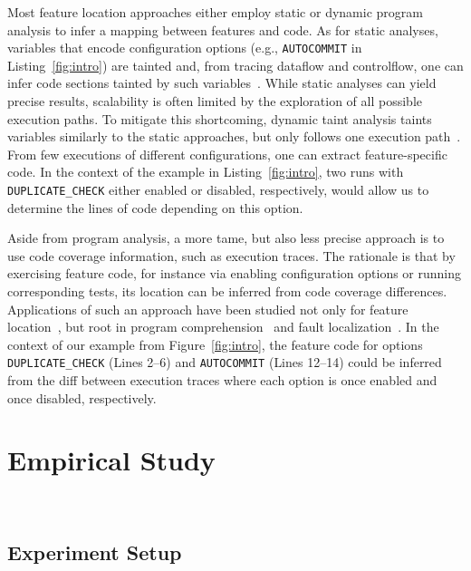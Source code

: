 Most feature location approaches either employ static or dynamic program analysis to infer a mapping between features and code. As for static analyses, variables that encode configuration options (e.g., \texttt{AUTOCOMMIT} in Listing~\ref{fig:intro}) are tainted and, from tracing dataflow and controlflow, one can infer code sections tainted by such variables~\cite{velez_2020_configcrusher_jase,lillack_2018_lotrack_tse,luo_2019_cova}.
While static analyses can yield precise results, scalability is often limited by the exploration of all possible execution paths. To mitigate this shortcoming, dynamic taint analysis taints variables similarly to the static approaches, but only follows one execution path~\cite{bell_phosphor_2014,velez_comprex_2021,splat_kim_2013}. From few executions of different configurations, one can extract feature-specific code. In the context of the example in Listing~\ref{fig:intro}, two runs with \texttt{DUPLICATE\_CHECK} either enabled or disabled, respectively, would allow us to determine the lines of code depending on this option.


Aside from program analysis, a more tame, but also less precise approach is to use code coverage information, such as execution traces.
The rationale is that by exercising feature code, for instance via enabling configuration options or running corresponding tests, its location can be inferred from code coverage differences. Applications of such an approach have been studied not only for feature location~\cite{wong_integrated_2005,sulir_annotation_2015,michelon_spectrum_2021,perez_framing_2016}, but root in program comprehension~\cite{wilde_early_1996,wilde_reconnaissance_1995,sherwood_reducing_nodate,perez_diagnosis_2014,castro_pangolin_2019} and fault localization~\cite{agrawal_fault_1995,wong_faultloc_2016}. In the context of our example from Figure~\ref{fig:intro}, the feature code for options \texttt{DUPLICATE\_CHECK} (\colorbox{duplicatecheck}{Lines 2--6}) and \texttt{AUTOCOMMIT} (\colorbox{autocommit}{Lines 12–14}) could be inferred from the diff between execution traces where each option is once enabled and once disabled, respectively.


\section{Empirical Study}~\label{sec:study}
\subsection{Experiment Setup}\label{sec:setup}
